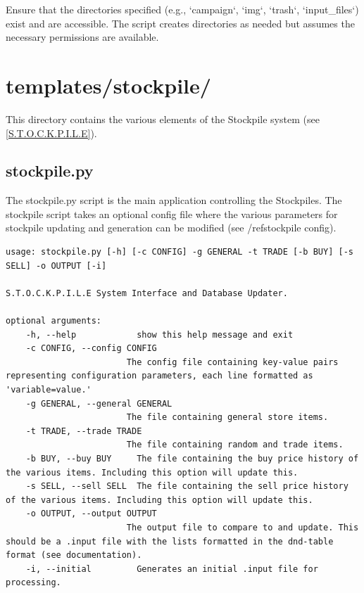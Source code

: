 Ensure that the directories specified (e.g., `campaign`, `img`, `trash`, `input\_files`) exist and are accessible. The script creates directories as needed but assumes the necessary permissions are available.

















\section{templates/stockpile/}

This directory contains the various elements of the Stockpile system (see \ref{S.T.O.C.K.P.I.L.E}).

\subsection{stockpile.py}

The stockpile.py script is the main application controlling the Stockpiles. The stockpile script takes an optional config file where the various parameters for stockpile updating and generation can be modified (see /ref{stockpile config}).

\begin{lstlisting}
usage: stockpile.py [-h] [-c CONFIG] -g GENERAL -t TRADE [-b BUY] [-s SELL] -o OUTPUT [-i]

S.T.O.C.K.P.I.L.E System Interface and Database Updater.

optional arguments:
	-h, --help            show this help message and exit
	-c CONFIG, --config CONFIG
	                    The config file containing key-value pairs representing configuration parameters, each line formatted as 'variable=value.'
	-g GENERAL, --general GENERAL
	                    The file containing general store items.
	-t TRADE, --trade TRADE
	                    The file containing random and trade items.
	-b BUY, --buy BUY     The file containing the buy price history of the various items. Including this option will update this.
	-s SELL, --sell SELL  The file containing the sell price history of the various items. Including this option will update this.
	-o OUTPUT, --output OUTPUT
	                    The output file to compare to and update. This should be a .input file with the lists formatted in the dnd-table format (see documentation).
	-i, --initial         Generates an initial .input file for processing.
\end{lstlisting}

